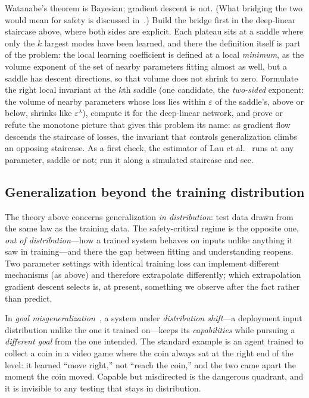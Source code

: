 \begin{openproblem}
Watanabe's theorem is Bayesian; gradient descent is not. (What bridging the two would mean for safety is discussed in~\cite{lehalleur2025}.) Build the bridge first in the deep-linear staircase above, where both sides are explicit. Each plateau sits at a saddle where only the $k$ largest modes have been learned, and there the definition itself is part of the problem: the local learning coefficient is defined at a local \emph{minimum}, as the volume exponent of the set of nearby parameters fitting almost as well, but a saddle has descent directions, so that volume does not shrink to zero. Formulate the right local invariant at the $k$th saddle (one candidate, the \emph{two-sided} exponent: the volume of nearby parameters whose loss lies within $\varepsilon$ of the saddle's, above or below, shrinks like $\varepsilon^{\lambda}$), compute it for the deep-linear network, and prove or refute the monotone picture that gives this problem its name: as gradient flow descends the staircase of losses, the invariant that controls generalization climbs an opposing staircase. As a first check, the estimator of Lau et al.~\cite{lau2023} runs at any parameter, saddle or not; run it along a simulated staircase and see.
\end{openproblem}

\subsection{Generalization beyond the training distribution}

The theory above concerns generalization \emph{in distribution}: test data drawn from the same law as the training data. The safety-critical regime is the opposite one, \emph{out of distribution}---how a trained system behaves on inputs unlike anything it saw in training---and there the gap between fitting and understanding reopens. Two parameter settings with identical training loss can implement different mechanisms (as above) and therefore extrapolate differently; which extrapolation gradient descent selects is, at present, something we observe after the fact rather than predict.

In \emph{goal misgeneralization}~\cite{langosco2022}, a system under \emph{distribution shift}---a deployment input distribution unlike the one it trained on---keeps its \emph{capabilities} while pursuing a \emph{different goal} from the one intended. The standard example is an agent trained to collect a coin in a video game where the coin always sat at the right end of the level: it learned ``move right,'' not ``reach the coin,'' and the two came apart the moment the coin moved. Capable but misdirected is the dangerous quadrant, and it is invisible to any testing that stays in distribution.

